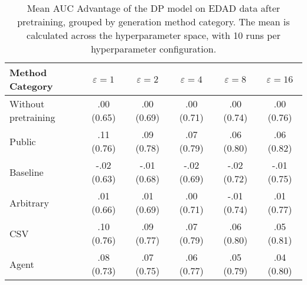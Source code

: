 \begin{table}[h!]
    \centering
    \caption{Mean AUC Advantage of the DP model on EDAD data after pretraining, grouped by generation method category. The mean is calculated across the hyperparameter space, with 10 runs per hyperparameter configuration.}
    \label{tab:epsilon_comparison}
    \begin{tabular}{lccccc}
    \toprule
    Method Category & $\varepsilon=1$ & $\varepsilon=2$ & $\varepsilon=4$ & $\varepsilon=8$ & $\varepsilon=16$ \\
    \midrule
    Without pretraining & .00 {\small (0.65)} & .00 {\small (0.69)} & .00 {\small (0.71)} & .00 {\small (0.74)} & .00 {\small (0.76)} \\
    \arrayrulecolor{black!50!}\midrule
    Public & \cellcolor{gold!30}.11 {\small (0.76)} & \cellcolor{gold!30}.09 {\small (0.78)} & \cellcolor{gold!30}.07 {\small (0.79)} & \cellcolor{silver!30}.06 {\small (0.80)} & \cellcolor{gold!30}.06 {\small (0.82)} \\
    \arrayrulecolor{black!50!}\midrule
    Baseline & -.02 {\small (0.63)} & -.01 {\small (0.68)} & -.02 {\small (0.69)} & -.02 {\small (0.72)} & -.01 {\small (0.75)} \\
    \arrayrulecolor{black!50!}\midrule
    Arbitrary & .01 {\small (0.66)} & .01 {\small (0.69)} & .00 {\small (0.71)} & -.01 {\small (0.74)} & .01 {\small (0.77)} \\
    \arrayrulecolor{black!50!}\midrule
    CSV & \cellcolor{silver!30}.10 {\small (0.76)} & \cellcolor{silver!30}.09 {\small (0.77)} & \cellcolor{silver!30}.07 {\small (0.79)} & \cellcolor{gold!30}.06 {\small (0.80)} & \cellcolor{silver!30}.05 {\small (0.81)} \\
    Agent & \cellcolor{bronze!30}.08 {\small (0.73)} & \cellcolor{bronze!30}.07 {\small (0.75)} & \cellcolor{bronze!30}.06 {\small (0.77)} & \cellcolor{bronze!30}.05 {\small (0.79)} & \cellcolor{bronze!30}.04 {\small (0.80)} \\
    \bottomrule
    \end{tabular}
\end{table}